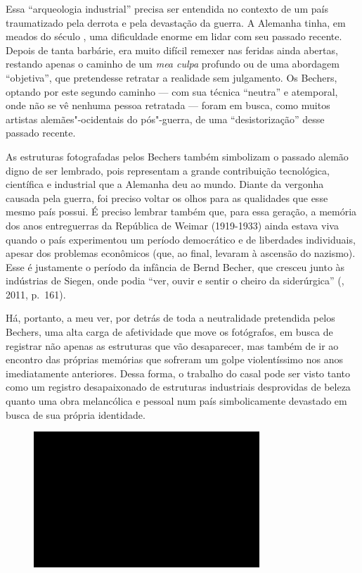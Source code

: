 Essa ``arqueologia industrial'' precisa ser entendida no contexto de um
país traumatizado pela derrota e pela devastação da guerra. A Alemanha
tinha, em meados do século , uma dificuldade enorme em lidar com seu
passado recente. Depois de tanta barbárie, era muito difícil remexer nas
feridas ainda abertas, restando apenas o caminho de um \emph{mea culpa}
profundo ou de uma abordagem ``objetiva'', que pretendesse retratar a
realidade sem julgamento. Os Bechers, optando por este segundo caminho
--- com sua técnica ``neutra'' e atemporal, onde não se vê nenhuma pessoa
retratada --- foram em busca, como muitos artistas alemães"-ocidentais do
pós"-guerra, de uma ``desistorização'' desse passado recente.

As estruturas fotografadas pelos Bechers também simbolizam o passado
alemão digno de ser lembrado, pois representam a grande contribuição
tecnológica, científica e industrial que a Alemanha deu ao mundo. Diante
da vergonha causada pela guerra, foi preciso voltar os olhos para as
qualidades que esse mesmo país possui. É preciso lembrar também que,
para essa geração, a memória dos anos entreguerras da República de
Weimar (1919-1933) ainda estava viva quando o país experimentou um
período democrático e de liberdades individuais, apesar dos problemas
econômicos (que, ao final, levaram à ascensão do nazismo). Esse é
justamente o período da infância de Bernd Becher, que cresceu junto às
indústrias de Siegen, onde podia ``ver, ouvir e sentir o cheiro da
siderúrgica'' (, 2011, p.~161).

Há, portanto, a meu ver, por detrás de toda a neutralidade pretendida
pelos Bechers, uma alta carga de afetividade que move os fotógrafos, em
busca de registrar não apenas as estruturas que vão desaparecer, mas
também de ir ao encontro das próprias memórias que sofreram um golpe
violentíssimo nos anos imediatamente anteriores. Dessa forma, o trabalho
do casal pode ser visto tanto como um registro desapaixonado de
estruturas industriais desprovidas de beleza quanto uma obra melancólica
e pessoal num país simbolicamente devastado em busca de sua própria
identidade.

\begin{figure}[!ht]
\centering
 \includegraphics[width=85mm]{./imgs/im1.jpg}
\caption{\tiny{}}
\end{figure}

